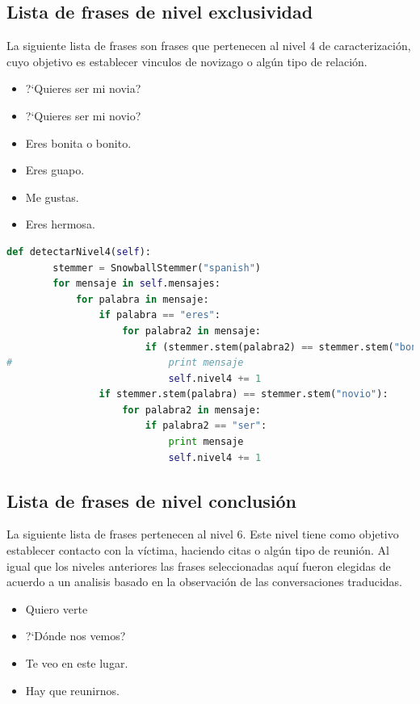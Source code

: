 \subsection{Lista de frases de nivel exclusividad}
La siguiente lista de frases son frases que pertenecen al nivel 4 de caracterizaci\'on, cuyo objetivo es establecer vinculos de novizago o alg\'un tipo de relaci\'on. 


\begin{itemize}
\item ?`Quieres ser mi novia?
\item ?`Quieres ser mi novio?
\item Eres bonita o bonito.
\item Eres guapo.
\item Me gustas. 
\item Eres hermosa.
\end{itemize}

\begin{lstlisting}[language=Python]
def detectarNivel4(self):
		stemmer = SnowballStemmer("spanish")
		for mensaje in self.mensajes:
			for palabra in mensaje:
				if palabra == "eres":
					for palabra2 in mensaje:
						if (stemmer.stem(palabra2) == stemmer.stem("bonita")) or (stemmer.stem(palabra2) == stemmer.stem("sexy")) or (stemmer.stem(palabra2) == stemmer.stem("hermoso")):
#							print mensaje
							self.nivel4 += 1
				if stemmer.stem(palabra) == stemmer.stem("novio"):
					for palabra2 in mensaje:
						if palabra2 == "ser":
							print mensaje	
							self.nivel4 += 1

\end{lstlisting}
\subsection{Lista de frases de nivel conclusi\'on}
La siguiente lista de frases pertenecen al nivel 6. Este nivel tiene como objetivo establecer contacto con la v\'ictima, haciendo citas o alg\'un tipo de reuni\'on. Al igual que los niveles anteriores las frases seleccionadas aqu\'i fueron elegidas de acuerdo a un analisis basado en la observaci\'on de las conversaciones traducidas.


\begin{itemize}
\item Quiero verte
\item ?`D\'onde nos vemos?
\item Te veo en este lugar.
\item Hay que reunirnos.
\end{itemize}

